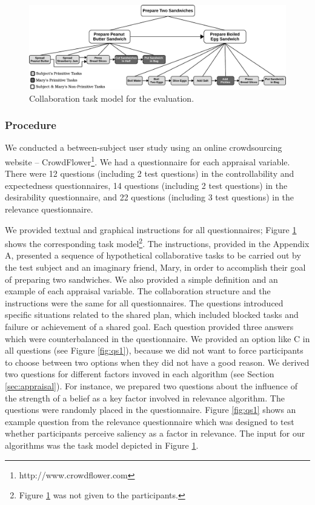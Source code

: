 \documentclass[12pt]{report}
\begin{document}
\begin{figure}[tbh]
  \centering
  \includegraphics[width=1\textwidth]{figure/taskModel-croped.pdf}
  \caption{Collaboration task model for the evaluation.}
  \label{fig:taskModel}
\end{figure}

\subsubsection{Procedure}
 We conducted a between-subject user study using an online crowdsourcing website
 -- CrowdFlower\footnote{http://www.crowdflower.com}. We had a questionnaire for
 each appraisal variable. There were 12 questions (including 2 test questions)
 in the controllability and expectedness questionnaires, 14 questions (including
 2 test questions) in the desirability questionnaire, and 22 questions
 (including 3 test questions) in the relevance questionnaire.
 
We provided textual and graphical instructions for all questionnaires; Figure
\ref{fig:taskModel} shows the corresponding task
model\footnote{{\color{red}Figure \ref{fig:taskModel} was not given to the
participants.}}. The instructions, provided in the Appendix A, presented a
sequence of hypothetical collaborative tasks to be carried out by the test subject and an imaginary friend, Mary, in
order to accomplish their goal of preparing two sandwiches. We also provided a
simple definition and an example of each appraisal variable. The collaboration
structure and the instructions were the same for all questionnaires. The
questions introduced specific situations related to the shared plan, which
included blocked tasks and failure or achievement of a shared goal. Each
question provided three answers which were counterbalanced in the questionnaire.
We provided an option like C in all questions (see Figure \ref{fig:qs1}),
because we did not want to force participants to choose between two options when
they did not have a good reason. {\color{red}We derived two questions for
different factors invoved in each algorithm (see Section \ref{sec:appraisal}).
For instance, we prepared two questions about the influence of the strength of a
belief as a key factor involved in relevance algorithm.} The questions were
randomly placed in the questionnaire. Figure \ref{fig:qs1} shows an example
question from the relevance questionnaire which was designed to test whether
participants perceive saliency as a factor in relevance. The input for our
algorithms was the task model depicted in Figure \ref{fig:taskModel}.
\end{document}
